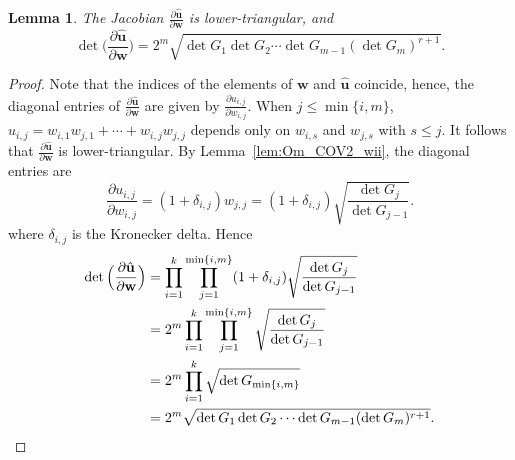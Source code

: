 \documentclass[twoside]{amsart}
\newtheorem{lemma}[theorem]{Lemma}
\theoremstyle{definition}
\theoremstyle{remark}
\numberwithin{equation}{section}
\begin{document}
\begin{lemma}
\label{lem:Om_COV2_JacobianDet}
The Jacobian $\frac{\partial \hat{\mathbf{u}} }{\partial \mathbf{w} }$ is lower-triangular, and
\[
    \det\Big(\frac{\partial \hat{\mathbf{u}} }{\partial \mathbf{w} }\Big)
    =
    2^m \sqrt{\det G_1\det G_2\cdots\det G_{m-1}(\det G_m)^{r+1} }.
\]
\end{lemma}
\begin{proof}
Note that the indices of the elements of $\mathbf{w}$ and $\hat{\mathbf{u}}$ coincide, hence, the diagonal entries of
$\frac{\partial \hat{\mathbf{u}} }{\partial \mathbf{w} }$ are given by $\frac{\partial u_{i,j} }{\partial w_{i,j} }$.
When $j\leq \min\{i,m\}$, $u_{i,j} = w_{i,1} w_{j,1} + \cdots + w_{i,j} w_{j,j}$ depends only on $w_{i,s}$ and $w_{j,s}$ with $s\leq j$.
It follows that $\frac{\partial \hat{\mathbf{u}} }{\partial \mathbf{w} }$ is
lower-triangular. By Lemma~\ref{lem:Om_COV2_wii}, the diagonal entries are
\begin{equation}
\label{eq:Om_COV2_JacobianDetPartialDeriv}
    \frac{\partial u_{i,j}}{\partial w_{i,j}}
    =
    (1 + \delta_{i,j}) w_{j,j}
    =
    (1 + \delta_{i,j}) \sqrt{ \frac{\det G_j}{\det G_{j-1}} }.
\end{equation}
where $\delta_{i,j}$ is the Kronecker delta. Hence
\begin{align*}
    \det\Big(\frac{\partial \hat{\mathbf{u}} }{\partial \mathbf{w} }\Big)
    &=
    \prod\limits_{i=1}^k \prod\limits_{j=1}^{\min\{i,m\}} (1 + \delta_{i,j}) \sqrt{ \frac{\det G_j}{\det G_{j-1}} }
    \\&=
    2^m \prod\limits_{i=1}^k \prod\limits_{j=1}^{\min\{i,m\}} \sqrt{ \frac{\det G_j}{\det G_{j-1}} }
    \\&=
    2^m \prod\limits_{i=1}^k  \sqrt{ \det G_{\min\{i,m\}} }
    \\&=
    2^m \sqrt{\det G_1\det G_2\cdots\det G_{m-1}(\det G_m)^{r+1} }.
    \qedhere
\end{align*}
\end{proof}
\end{document}
